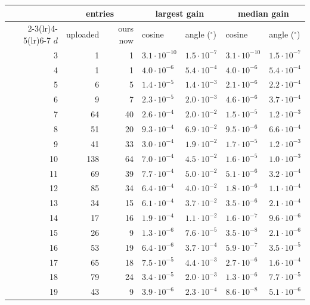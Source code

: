 \begin{tabular}{rrrllll}
\toprule
 & \multicolumn{2}{c}{entries} & \multicolumn{2}{c}{largest gain} & \multicolumn{2}{c}{median gain} \\
\cmidrule(lr){2-3}\cmidrule(lr){4-5}\cmidrule(lr){6-7}
$d$ & uploaded & ours now & cosine & angle ($^\circ$) & cosine & angle ($^\circ$) \\
\midrule
3 & 1 & 1 & $3.1\cdot10^{-10}$ & $1.5\cdot10^{-7}$ & $3.1\cdot10^{-10}$ & $1.5\cdot10^{-7}$ \\
4 & 1 & 1 & $4.0\cdot10^{-6}$ & $5.4\cdot10^{-4}$ & $4.0\cdot10^{-6}$ & $5.4\cdot10^{-4}$ \\
5 & 6 & 5 & $1.4\cdot10^{-5}$ & $1.4\cdot10^{-3}$ & $2.1\cdot10^{-6}$ & $2.2\cdot10^{-4}$ \\
6 & 9 & 7 & $2.3\cdot10^{-5}$ & $2.0\cdot10^{-3}$ & $4.6\cdot10^{-6}$ & $3.7\cdot10^{-4}$ \\
7 & 64 & 40 & $2.6\cdot10^{-4}$ & $2.0\cdot10^{-2}$ & $1.5\cdot10^{-5}$ & $1.2\cdot10^{-3}$ \\
8 & 51 & 20 & $9.3\cdot10^{-4}$ & $6.9\cdot10^{-2}$ & $9.5\cdot10^{-6}$ & $6.6\cdot10^{-4}$ \\
9 & 41 & 33 & $3.0\cdot10^{-4}$ & $1.9\cdot10^{-2}$ & $1.7\cdot10^{-5}$ & $1.2\cdot10^{-3}$ \\
10 & 138 & 64 & $7.0\cdot10^{-4}$ & $4.5\cdot10^{-2}$ & $1.6\cdot10^{-5}$ & $1.0\cdot10^{-3}$ \\
11 & 69 & 39 & $7.7\cdot10^{-4}$ & $5.0\cdot10^{-2}$ & $5.1\cdot10^{-6}$ & $3.2\cdot10^{-4}$ \\
12 & 85 & 34 & $6.4\cdot10^{-4}$ & $4.0\cdot10^{-2}$ & $1.8\cdot10^{-6}$ & $1.1\cdot10^{-4}$ \\
13 & 34 & 15 & $6.1\cdot10^{-4}$ & $3.7\cdot10^{-2}$ & $3.5\cdot10^{-6}$ & $2.1\cdot10^{-4}$ \\
14 & 17 & 16 & $1.9\cdot10^{-4}$ & $1.1\cdot10^{-2}$ & $1.6\cdot10^{-7}$ & $9.6\cdot10^{-6}$ \\
15 & 26 & 9 & $1.3\cdot10^{-6}$ & $7.6\cdot10^{-5}$ & $3.5\cdot10^{-8}$ & $2.1\cdot10^{-6}$ \\
16 & 53 & 19 & $6.4\cdot10^{-6}$ & $3.7\cdot10^{-4}$ & $5.9\cdot10^{-7}$ & $3.5\cdot10^{-5}$ \\
17 & 65 & 18 & $7.5\cdot10^{-5}$ & $4.4\cdot10^{-3}$ & $2.7\cdot10^{-6}$ & $1.6\cdot10^{-4}$ \\
18 & 79 & 24 & $3.4\cdot10^{-5}$ & $2.0\cdot10^{-3}$ & $1.3\cdot10^{-6}$ & $7.7\cdot10^{-5}$ \\
19 & 43 & 9 & $3.9\cdot10^{-6}$ & $2.3\cdot10^{-4}$ & $8.6\cdot10^{-8}$ & $5.1\cdot10^{-6}$ \\

\end{tabular}

